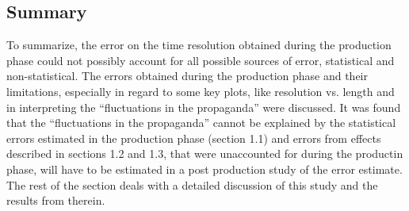 \documentclass[12pt]{article}
\begin{document}
\subsection{Summary}
To summarize, the error on the time resolution obtained during the production phase could not possibly account for all possible sources of error, statistical and non-statistical. The errors obtained during the production phase and their limitations, especially in regard to some key plots, like resolution vs. length and in interpreting the ``fluctuations in the propaganda'' were discussed. It was found that the ``fluctuations in the propaganda'' cannot be explained by the statistical errors estimated in the production phase (section 1.1) and errors from effects described in sections 1.2 and 1.3, that were unaccounted for during the productin phase, will have to be estimated in a post production study of the error estimate. The rest of the section deals with a detailed discussion of this study and the results from therein.
\end{document}

